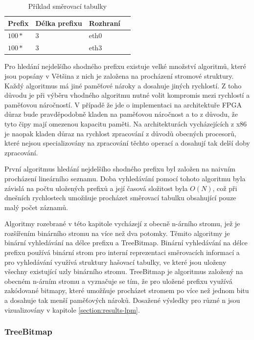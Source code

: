 \begin{table}[!htbp]
	\center
    \begin{tabular}{|l|l|l|l|}
    \hline
    Prefix & Délka prefixu & Rozhraní \\ \hline
    $100*$ & 3 & eth0 \\ \hline
    $100*$ & 3 & eth3 \\ \hline
    \end{tabular}
    \caption{Příklad směrovací tabulky}
\end{table}

Pro hledání nejdelšího shodného prefixu existuje velké množství algoritmů, které jsou popsány v \cite{tbm}
Většina z nich je založena na procházení stromové struktury. Každý algoritmus má jiné paměťové nároky
a dosahuje jiných rychlostí. Z toho důvodu je při výběru vhodného algoritmu nutné
volit kompromis mezi rychlostí a paměťovou náročností.
V případě že jde o implementaci na architektuře FPGA důraz bude pravděpodobně kladen na paměťovou náročnost
a to z důvodu, že tyto čipy mají omezenou kapacitu paměti. Na architekturách vycházejících z x86 je naopak kladen důraz
na rychlost zpracování z důvodů obecných procesorů, které nejsou specializovány na zpracování těchto operací
a dosahují tak delší doby zpracování.

První algoritmus hledání nejdelšího shodného prefixu byl založen na naivním procházení lineárního
seznamu. Doba vyhledávání pomocí tohoto algoritmu byla závislá na počtu uložených prefixů a její
časová složitost byla $O(N)$, což při dnešních rychlostech umožňuje procházet směrovací tabulku
obsahující pouze malý počet záznamů.

Algoritmy rozebrané v této kapitole vycházejí z obecně n-árního stromu,
jež je rozšířením binárního stromu na více než dva potomky.
Těmito algoritmy je binární vyhledávání na délce prefixu a TreeBitmap.
Binární vyhledávání na délce prefixu používá binární strom pro interní reprezentaci směrovacích
informací a pro vyhledávání využívá struktury hašovací tabulky, ve které jsou uloženy všechny existující uzly
binárního stromu.
TreeBitmap je algoritmus založený na obecném n-árním stromu a vyznačuje se tím,
že pro uložené prefixu využívá zakódované bitmapy, které umožňuje procházet stromem
po více než jednom bitu a dosahuje tak menší paměťových nároků.
Dosažené výsledky pro různé n jsou vizualizovány v kapitole \ref{section:results-lpm}.


\subsubsection{TreeBitmap} %

